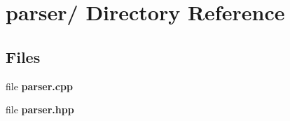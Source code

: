 \section{parser/ Directory Reference}
\label{dir_000004}
\subsection*{Files}
\begin{CompactItemize}
\item 
file {\bf parser.cpp}
\item 
file {\bf parser.hpp}
\end{CompactItemize}
